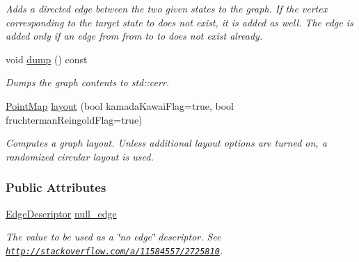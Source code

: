 \begin{DoxyCompactItemize}
\begin{DoxyCompactList}\small\item\em Adds a directed edge between the two given states to the graph. If the vertex corresponding to the target state {\ttfamily to} does not exist, it is added as well. The edge is added only if an edge from {\ttfamily from} to {\ttfamily to} does not exist already. \end{DoxyCompactList}\item 
void \hyperlink{structslb_1_1core_1_1ui_1_1StateGraph_ae2e9d82bc2fcbbf3ba1a6e68ad566850}{dump} () const \hypertarget{structslb_1_1core_1_1ui_1_1StateGraph_ae2e9d82bc2fcbbf3ba1a6e68ad566850}{}\label{structslb_1_1core_1_1ui_1_1StateGraph_ae2e9d82bc2fcbbf3ba1a6e68ad566850}

\begin{DoxyCompactList}\small\item\em Dumps the graph contents to std\+::cerr. \end{DoxyCompactList}\item 
\hyperlink{structslb_1_1core_1_1ui_1_1StateGraph_abc09edc649d6690817cb6219e3feefb0}{Point\+Map} \hyperlink{structslb_1_1core_1_1ui_1_1StateGraph_a86b595a67d92fa9991f823db3649c105}{layout} (bool kamada\+Kawai\+Flag=true, bool fruchterman\+Reingold\+Flag=true)
\begin{DoxyCompactList}\small\item\em Computes a graph layout. Unless additional layout options are turned on, a randomized circular layout is used. \end{DoxyCompactList}\end{DoxyCompactItemize}
\subsubsection*{Public Attributes}
\begin{DoxyCompactItemize}
\item 
\hyperlink{structslb_1_1core_1_1ui_1_1StateGraph_a7e894f002383b1687652a91549c3656d}{Edge\+Descriptor} \hyperlink{structslb_1_1core_1_1ui_1_1StateGraph_aafbde9fc1b97fd86cf56d8ad15621757}{null\+\_\+edge}\hypertarget{structslb_1_1core_1_1ui_1_1StateGraph_aafbde9fc1b97fd86cf56d8ad15621757}{}\label{structslb_1_1core_1_1ui_1_1StateGraph_aafbde9fc1b97fd86cf56d8ad15621757}

\begin{DoxyCompactList}\small\item\em The value to be used as a \char`\"{}no edge\char`\"{} descriptor. See \href{http://stackoverflow.com/a/11584557/2725810}{\tt http\+://stackoverflow.\+com/a/11584557/2725810}. \end{DoxyCompactList}\end{DoxyCompactItemize}
